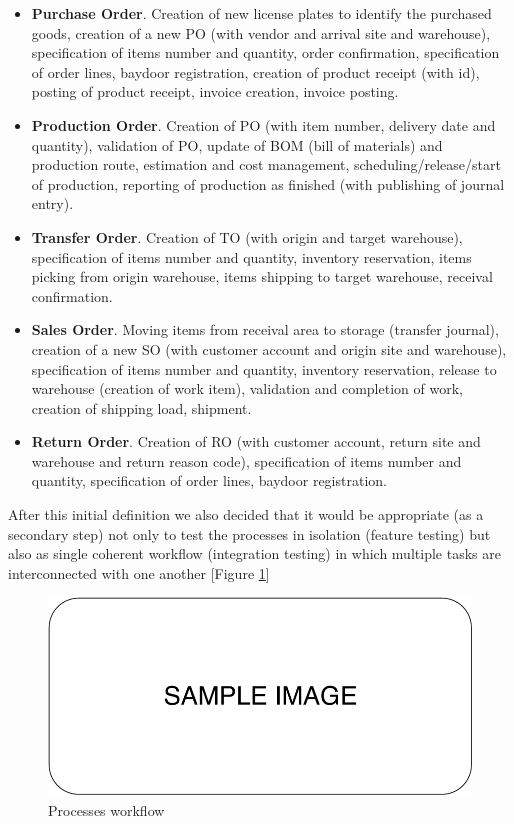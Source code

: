 \begin{itemize}
    \item \textbf{Purchase Order}. Creation of new license plates to identify the purchased goods, creation of a new PO (with vendor and arrival site and warehouse), specification of items number and quantity, order confirmation, specification of order lines, baydoor registration, creation of product receipt (with id), posting of product receipt, invoice creation, invoice posting.
    \item \textbf{Production Order}. Creation of PO (with item number, delivery date and quantity), validation of PO, update of BOM (bill of materials) and production route, estimation and cost management, scheduling/release/start of production, reporting of production as finished (with publishing of journal entry). 
    \item \textbf{Transfer Order}. Creation of TO (with origin and target warehouse), specification of items number and quantity, inventory reservation, items picking from origin warehouse, items shipping to target warehouse, receival confirmation.
    \item \textbf{Sales Order}. Moving items from receival area to storage (transfer journal), creation of a new SO (with customer account and origin site and warehouse), specification of items number and quantity, inventory reservation, release to warehouse (creation of work item), validation and completion of work, creation of shipping load, shipment.  
    \item \textbf{Return Order}. Creation of RO (with customer account, return site and warehouse and return reason code), specification of items number and quantity, specification of order lines, baydoor registration.
\end{itemize}

After this initial definition we also decided that it would be appropriate (as a secondary step) not only to test the processes in isolation (feature testing) but also as single coherent workflow (integration testing) in which multiple tasks are interconnected with one another [Figure \ref{fig:processesWorkflow}]

\begin{figure}[ht]
	\centering
	\includegraphics[scale=0.7]{Images/SampleImage.pdf}
	\caption{Processes workflow}
	\label{fig:processesWorkflow}
\end{figure}

